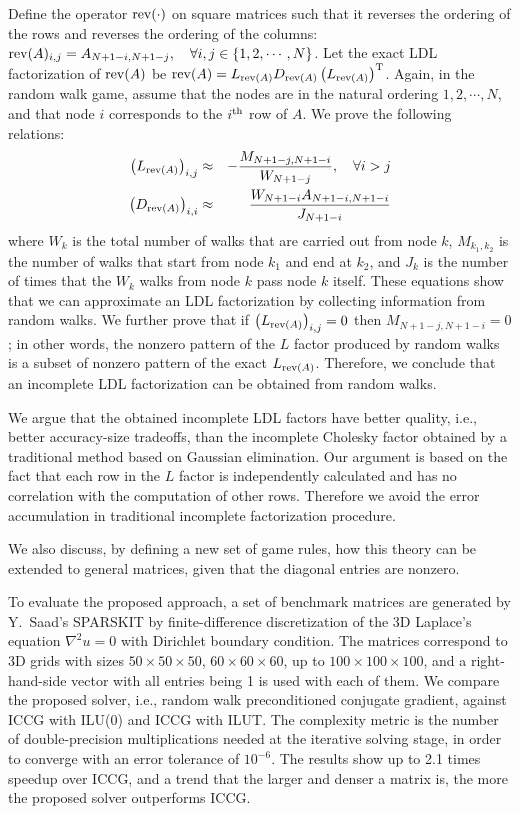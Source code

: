 \documentclass[twosided]{report}
\begin{document}
Define the operator ${\rm rev}(\cdot)$ on square matrices
such that it reverses the ordering of the rows and reverses
the ordering of the columns: ${\rm
rev}(A)_{i,j}=A_{N+1-i,N+1-j} , \quad \forall i,j \in \{
1,2,\cdots,N \}$. Let the exact LDL factorization of ${\rm
rev}(A)$ be ${\rm rev}(A) = L_{{\rm rev}(A)} D_{{\rm
rev}(A)} \left( L_{{\rm rev}(A)} \right)^{\rm T}$. Again, in
the random walk game, assume that the nodes are in the
natural ordering $1,2,\cdots,N$, and that node $i$
corresponds to the $i^{\rm th}$ row of $A$. We prove the
following relations:
\begin{eqnarray*}
\left( L_{{\rm rev}(A)} \right)_{i,j} & \approx &
- \frac{M_{N+1-j,N+1-i}}{W_{N+1-j}}, \quad\forall i>j \\
\left( D_{{\rm rev}(A)} \right)_{i,i} & \approx &
\frac{W_{N+1-i} A_{N+1-i,N+1-i}} {J_{N+1-i}}
\end{eqnarray*}
where $W_k$ is the total number of walks that are carried
out from node $k$, $M_{k_1,k_2}$ is the number of walks that
start from node $k_1$ and end at $k_2$, and $J_{k}$ is the
number of times that the $W_k$ walks from node $k$ pass node
$k$ itself. These equations show that we can approximate an
LDL factorization by collecting information from random
walks. We further prove that if $\left( L_{{\rm rev}(A)}
\right)_{i,j} = 0$ then $M_{N+1-j,N+1-i} = 0$; in other
words, the nonzero pattern of the $L$ factor produced by
random walks is a subset of nonzero pattern of the exact
$L_{{\rm rev}(A)}$. Therefore, we conclude that an
incomplete LDL factorization can be obtained from random
walks.

We argue that the obtained incomplete LDL factors
have better quality, i.e., better accuracy-size tradeoffs,
than the incomplete Cholesky factor obtained by a
traditional method based on Gaussian elimination. Our
argument is based on the fact that each row in the $L$
factor is independently calculated and has no correlation
with the computation of other rows. Therefore we avoid the
error accumulation in traditional incomplete factorization
procedure.

We also discuss, by defining a new set of game
rules, how this theory can be extended to general matrices,
given that the diagonal entries are nonzero.

To evaluate
the proposed approach, a set of benchmark matrices are
generated by Y.~Saad's SPARSKIT by finite-difference
discretization of the 3D Laplace's equation
$\nabla^2 u = 0$
with Dirichlet boundary condition. The matrices
correspond to 3D grids with sizes
$50\times 50\times 50$,
$60\times 60\times 60$, up to
$100\times 100\times 100$, and a
right-hand-side vector with all entries being 1 is used with
each of them. We compare the proposed solver, i.e., random
walk preconditioned conjugate gradient, against ICCG with
ILU(0) and ICCG with ILUT. The complexity metric is the
number of double-precision multiplications needed at the
iterative solving stage, in order to converge with an error
tolerance of $10^{-6}$. The results show up to 2.1 times
speedup over ICCG, and a trend that the larger and denser a
matrix is, the more the proposed solver outperforms ICCG.
\end{document}
